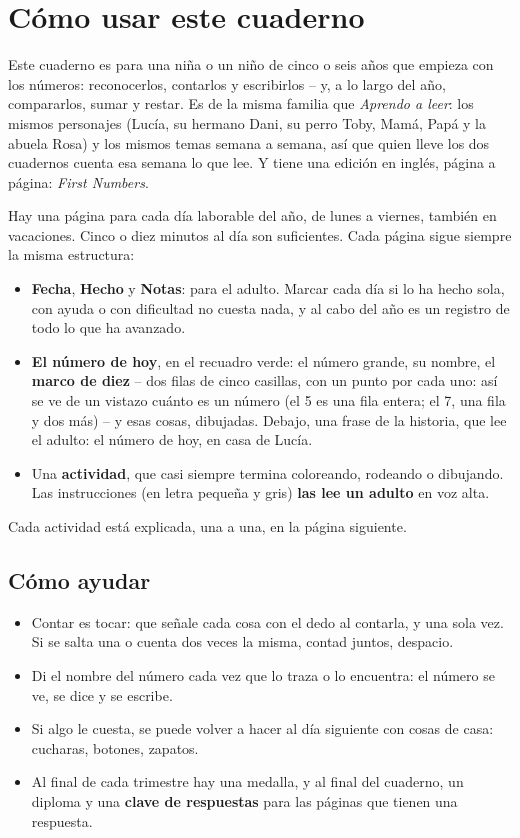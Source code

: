 \section*{Cómo usar este cuaderno}

Este cuaderno es para una niña o un niño de cinco o seis años que
empieza con los números: reconocerlos, contarlos y escribirlos -- y, a lo
largo del año, compararlos, sumar y restar. Es de la misma familia que
\emph{Aprendo a leer}: los mismos personajes (Lucía, su hermano Dani, su
perro Toby, Mamá, Papá y la abuela Rosa) y los mismos temas semana a
semana, así que quien lleve los dos cuadernos cuenta esa semana lo que
lee. Y tiene una edición en inglés, página a página: \emph{First
Numbers}.

Hay una página para cada día laborable del año, de lunes a viernes,
también en vacaciones. Cinco o diez minutos al día son suficientes.
Cada página sigue siempre la misma estructura:

\begin{itemize}[leftmargin=6mm]
\item \textbf{Fecha}, \textbf{Hecho} y \textbf{Notas}: para el adulto.
  Marcar cada día si lo ha hecho sola, con ayuda o con dificultad no
  cuesta nada, y al cabo del año es un registro de todo lo que ha
  avanzado.
\item \textbf{El número de hoy}, en el recuadro verde: el número grande,
  su nombre, el \textbf{marco de diez} -- dos filas de cinco casillas,
  con un punto por cada uno: así se ve de un vistazo cuánto es un
  número (el 5 es una fila entera; el 7, una fila y dos más) -- y esas
  cosas, dibujadas. Debajo, una frase de la historia, que lee el adulto:
  el número de hoy, en casa de Lucía.
\item Una \textbf{actividad}, que casi siempre termina coloreando,
  rodeando o dibujando. Las instrucciones (en letra pequeña y gris)
  \textbf{las lee un adulto} en voz alta.
\end{itemize}

Cada actividad está explicada, una a una, en la página siguiente.

\subsection*{Cómo ayudar}

{\small
\begin{itemize}[leftmargin=6mm, itemsep=1pt, topsep=2pt]
\item Contar es tocar: que señale cada cosa con el dedo al contarla, y
  una sola vez. Si se salta una o cuenta dos veces la misma, contad
  juntos, despacio.
\item Di el nombre del número cada vez que lo traza o lo encuentra: el
  número se ve, se dice y se escribe.
\item Si algo le cuesta, se puede volver a hacer al día siguiente con
  cosas de casa: cucharas, botones, zapatos.
\item Al final de cada trimestre hay una medalla, y al final del
  cuaderno, un diploma y una \textbf{clave de respuestas} para las
  páginas que tienen una respuesta.
\end{itemize}}
\newpage
